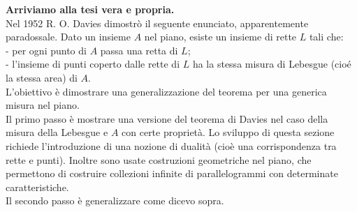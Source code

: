 \documentclass[11pt]{article}
\newcommand{\<}{\langle}
\renewcommand{\>}{\rangle}
\begin{document}
	\textbf{Arriviamo alla tesi vera e propria.}\\
	Nel 1952 R. O. Davies dimostrò il seguente enunciato, apparentemente paradossale. Dato un insieme $A$ nel piano, esiste un insieme di rette $L$ tali che:\\
	- per ogni punto di $A$ passa una retta di $L$;\\
	- l'insieme di punti coperto dalle rette di $L$ ha la stessa misura di Lebesgue (cioé la stessa area) di $A$.\\
	L'obiettivo è dimostrare una generalizzazione del teorema per una generica misura nel piano.\\
	Il primo passo è mostrare una versione del teorema di Davies nel caso della misura della Lebesgue e $A$ con certe proprietà. Lo sviluppo di questa sezione richiede l'introduzione di una nozione di dualità (cioè una corrispondenza tra rette e punti). Inoltre sono usate costruzioni geometriche nel piano, che permettono di costruire collezioni infinite di parallelogrammi con determinate caratteristiche.\\
	Il secondo passo è generalizzare come dicevo sopra.
	
	
	
	
\end{document}
